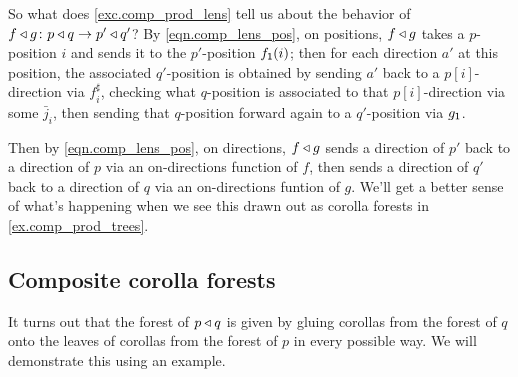 \documentclass[Book-Poly]{subfiles}
\begin{document}
So what does \cref{exc.comp_prod_lens} tell us about the behavior of $f\mathbin{\triangleleft} g\colon p\mathbin{\triangleleft} q\to p'\mathbin{\triangleleft} q'$?
By \eqref{eqn.comp_lens_pos}, on positions, $f\mathbin{\triangleleft} g$ takes a $p$-position $i$ and sends it to the $p'$-position $f_{\textsf{1}}(i)$; then for each direction $a'$ at this position, the associated $q'$-position is obtained by sending $a'$ back to a $p[i]$-direction via $f^\sharp_i$, checking what $q$-position is associated to that $p[i]$-direction via some $\bar{j}_i$, then sending that $q$-position forward again to a $q'$-position via $g_{\textsf{1}}$.

Then by \eqref{eqn.comp_lens_pos}, on directions, $f\mathbin{\triangleleft} g$ sends a direction of $p'$ back to a direction of $p$ via an on-directions function of $f$, then sends a direction of $q'$ back to a direction of $q$ via an on-directions funtion of $g$.
We'll get a better sense of what's happening when we see this drawn out as corolla forests in \cref{ex.comp_prod_trees}.

\subsection{Composite corolla forests} \label{subsec.comon.comp.def.corolla}

It turns out that the forest of $p\mathbin{\triangleleft} q$ is given by gluing corollas from the forest of $q$ onto the leaves of corollas from the forest of $p$ in every possible way.
We will demonstrate this using an example.
\end{document}

